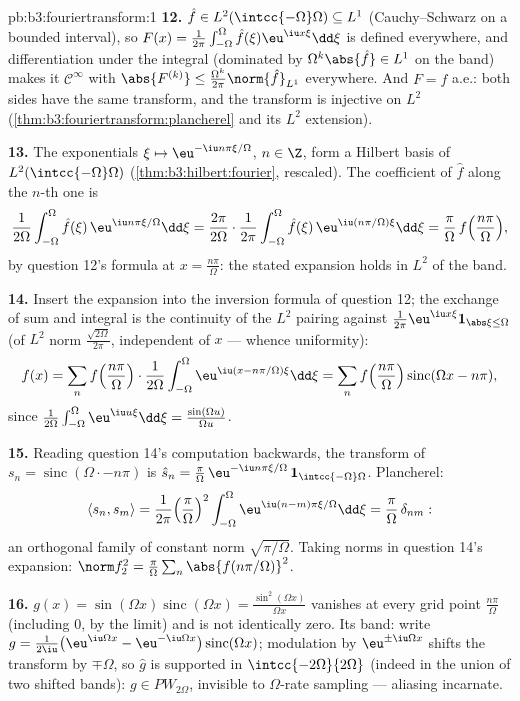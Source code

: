 \begin{solution}{pb:b3:fouriertransform:1}
\textbf{12.} $\hat f \in L^2(\intcc{-\Omega}\Omega)
\subseteq L^1$ (Cauchy--Schwarz on a bounded interval), so
$F(x) = \frac1{2\pi}\int_{-\Omega}^\Omega\hat
f(\xi)\eu^{\iu x\xi}\dd\xi$ is defined everywhere, and
differentiation under the integral (dominated by
$\Omega^k\abs{\hat f} \in L^1$ on the band) makes it
$\mathcal C^\infty$ with $\abs{F^{(k)}} \leq
\frac{\Omega^k}{2\pi}\norm{\hat f}_{L^1}$ everywhere. And $F
= f$ a.e.: both sides have the same transform, and the
transform is injective on $L^2$
(\cref{thm:b3:fouriertransform:plancherel} and its
$L^2$ extension).

\textbf{13.} The exponentials $\xi \mapsto \eu^{-\iu
n\pi\xi/\Omega}$, $n \in \Z$, form a Hilbert basis of
$L^2(\intcc{-\Omega}\Omega)$
(\cref{thm:b3:hilbert:fourier}, rescaled). The coefficient
of $\hat f$ along the $n$-th one is
\[
\frac1{2\Omega}\int_{-\Omega}^\Omega\hat f(\xi)\,
\eu^{\iu n\pi\xi/\Omega}\dd\xi
= \frac{2\pi}{2\Omega}\cdot
\frac1{2\pi}\int_{-\Omega}^{\Omega}\hat f(\xi)\,
\eu^{\iu(n\pi/\Omega)\xi}\dd\xi
= \frac\pi\Omega\,f\Bigl(\frac{n\pi}\Omega\Bigr),
\]
by question 12's formula at $x = \frac{n\pi}\Omega$: the
stated expansion holds in $L^2$ of the band.

\textbf{14.} Insert the expansion into the inversion formula
of question 12; the exchange of sum and integral is the
continuity of the $L^2$ pairing against $\frac1{2\pi}
\eu^{\iu x\xi}\mathbf 1_{\abs\xi\leq\Omega}$ (of $L^2$ norm
$\frac{\sqrt{2\Omega}}{2\pi}$, independent of $x$ ---
whence uniformity):
\[
f(x) = \sum_nf\Bigl(\frac{n\pi}\Omega\Bigr)\cdot
\frac1{2\Omega}\int_{-\Omega}^\Omega
\eu^{\iu(x - n\pi/\Omega)\xi}\dd\xi
= \sum_nf\Bigl(\frac{n\pi}\Omega\Bigr)
\operatorname{sinc}(\Omega x - n\pi),
\]
since $\frac1{2\Omega}\int_{-\Omega}^\Omega\eu^{\iu
u\xi}\dd\xi = \frac{\sin(\Omega u)}{\Omega u}$.

\textbf{15.} Reading question 14's computation backwards,
the transform of $s_n = \operatorname{sinc}(\Omega\cdot -
n\pi)$ is $\hat s_n = \frac\pi\Omega\,\eu^{-\iu
n\pi\xi/\Omega}\,\mathbf 1_{\intcc{-\Omega}\Omega}$.
Plancherel:
\[
\langle s_n, s_m\rangle = \frac1{2\pi}
\Bigl(\frac\pi\Omega\Bigr)^2\int_{-\Omega}^\Omega
\eu^{\iu(n-m)\pi\xi/\Omega}\dd\xi =
\frac\pi\Omega\,\delta_{nm} :
\]
an orthogonal family of constant norm
$\sqrt{\pi/\Omega}$. Taking norms in question 14's
expansion: $\norm f_2^2 =
\frac\pi\Omega\sum_n\abs{f(n\pi/\Omega)}^2$.

\textbf{16.} $g(x) = \sin(\Omega x)\operatorname{sinc}
(\Omega x) = \frac{\sin^2(\Omega x)}{\Omega x}$ vanishes at
every grid point $\frac{n\pi}\Omega$ (including $0$, by the
limit) and is not identically zero. Its band: write $g =
\frac1{2\iu}\bigl(\eu^{\iu\Omega x} - \eu^{-\iu\Omega
x}\bigr)\operatorname{sinc}(\Omega x)$; modulation by
$\eu^{\pm\iu\Omega x}$ shifts the transform by
$\mp\Omega$, so $\hat g$ is supported in
$\intcc{-2\Omega}{2\Omega}$ (indeed in the union of two
shifted bands): $g \in PW_{2\Omega}$, invisible to
$\Omega$-rate sampling --- aliasing incarnate.


\end{solution}
